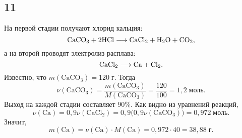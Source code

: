 \subsection{11}

На первой стадии получают хлорид кальция:
\[
\rm CaCO_3+2HCl\longrightarrow CaCl_2+H_2O+CO_2,
\]
а на второй проводят электролиз расплава:
\[
\rm CaCl_2\longrightarrow Ca+Cl_2.
\]
Известно, что $m(\mathrm{CaCO_3})=120\;\text{г}$. Тогда
\[
\nu(\mathrm{CaCO_3})=\frac{m(\mathrm{CaCO_3})}{M(\mathrm{CaCO_3})}=\frac{120}{100}=1{,}2\;\text{моль}.
\]
Выход на каждой стадии составляет $90\%$. Как видно из уравнений реакций,
\[
\nu(\mathrm{Ca})=0{,}9\nu(\mathrm{CaCl_2})=0{,}9\bigl(0{,}9\nu(\mathrm{CaCO_3})\bigr)=0{,}972\;\text{моль}.
\]
Значит,
\[
m(\mathrm{Ca})=\nu(\mathrm{Ca})\cdot M(\mathrm{Ca})=0{,}972\cdot40=38{,}88\;\text{г}.
\]